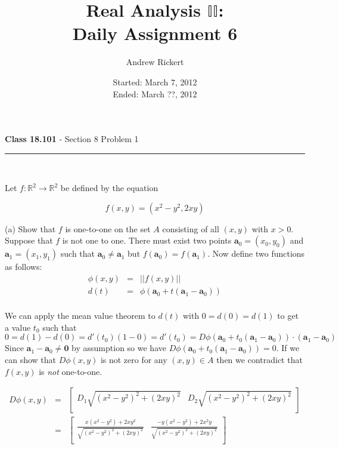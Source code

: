 \documentclass[11pt,reqno]{article}
\title{Real Analysis $\mathbb{II}$: \\ Daily Assignment 6}
\author{Andrew Rickert}
\date{Started: March 7, 2012 \\ \hspace{1pt} Ended: March ??,  2012}                                           %
\begin{document}
\maketitle

\begin{flushleft} 
\textbf{Class 18.101} - Section 8 Problem 1\\
\rule{500pt}{1pt}\\
\end{flushleft} 

\noindent Let $f : \mathbb{R}^2 \to \mathbb{R}^2$ be defined by the equation

\[ f(x,y) = (x^2 - y^2, 2 x y) \]

\noindent (a) Show that $f$ is one-to-one on the set $A$ consisting of all $(x,y)$ with $x > 0$. \\

Suppose that $f$ is not one to one. There must exist two points $\textbf{a}_0 = (x_0,y_0)$ and $\textbf{a}_1 = (x_1,y_1)$ such that $\textbf{a}_0 \neq \textbf{a}_1$ but $f(\textbf{a}_0) = f(\textbf{a}_1)$. Now define two functions as follows:
\begin{eqnarray*}
\phi(x,y) &=& ||f(x,y)||\\
d(t) &=& \phi(\textbf{a}_0 + t(\textbf{a}_1 - \textbf{a}_0))\\
\end{eqnarray*}

\noindent We can apply the mean value theorem to $d(t)$ with $0 = d(0) = d(1)$ to get a value $t_0$ such that 
\[ 0 = d(1) - d(0) = d'(t_0)(1 - 0) = d'(t_0) = D \phi(\textbf{a}_0 + t_0(\textbf{a}_1 - \textbf{a}_0)) \cdot (\textbf{a}_1 - \textbf{a}_0) \]
Since $\textbf{a}_1 - \textbf{a}_0 \neq \textbf{0}$ by assumption so we have $D \phi(\textbf{a}_0 + t_0(\textbf{a}_1 - \textbf{a}_0)) = 0$. If we can show that $D \phi(x,y)$ is not zero for any $(x,y) \in A$ then we contradict that $f(x,y)$ is \emph{not} one-to-one.

 \begin{eqnarray*} 
 D \phi(x,y) &=& \left[ \begin{array}{cc} 
 D_1 \sqrt{(x^2 - y^2)^2 + (2 x y)^2} & D_2 \sqrt{(x^2 - y^2)^2 + (2 x y)^2}\\
\end{array} \right] \\
		 &=& \left[ \begin{array}{cc} 
 \frac{x(x^2 - y^2) + 2 x y^2}{\sqrt{(x^2 - y^2)^2 + (2 x y)^2}} & \frac{-y(x^2 - y^2) + 2 x^2 y}{\sqrt{(x^2 - y^2)^2 + (2 x y)^2}}\\
\end{array} \right] \\
\end{eqnarray*}
\end{document}
